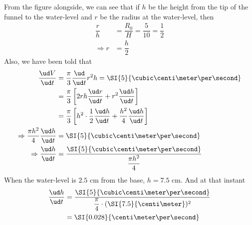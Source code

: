 \begin{solution}[\fullpage]
	From the figure alongside, we can see that if 
	$h$ be the height from the tip of the funnel to the water-level and $r$
	be the radius at the water-level, then 
	\begin{align}
		\dfrac{r}{h} &= \dfrac{R_0}{H} = \dfrac{5}{10} = \dfrac{1}{2} \\
		\Rightarrow r &= \dfrac{h}{2}
	\end{align}
	Also, we have been told that 
	\begin{align}
		\dfrac{\ud V}{\ud t} &= \dfrac{\pi}{3}\dfrac{\ud}{\ud t}r^2h = \SI{5}{\cubic\centi\meter\per\second} \\
		&= \dfrac{\pi}{3}\left[2rh\dfrac{\ud r}{\ud t} + r^2\dfrac{\ud h}{\ud t}\right] \\
		&= \dfrac{\pi}{3}\left[h^2\cdot\dfrac{1}{2}\dfrac{\ud h}{\ud t} + \dfrac{h^2}{4}\dfrac{\ud h}{\ud t} \right] \\
		\Rightarrow \dfrac{\pi h^2}{4}\dfrac{\ud h}{\ud t} &= \SI{5}{\cubic\centi\meter\per\second} \\
		\Rightarrow \dfrac{\ud h}{\ud t} &= \dfrac{\SI{5}{\cubic\centi\meter\per\second}}
		{\dfrac{\pi h^2}{4}}
	\end{align}
	When the water-level is $2.5$ cm from the base, $h = 7.5$ cm. And at that instant
	\begin{align}
		\dfrac{\ud h}{\ud t} &= \dfrac{\SI{5}{\cubic\centi\meter\per\second}}
		{\dfrac{\pi}{4}\cdot(\SI{7.5}{\centi\meter})^2} \\
		&= \SI{0.028}{\centi\meter\per\second}
	\end{align}
\end{solution}
